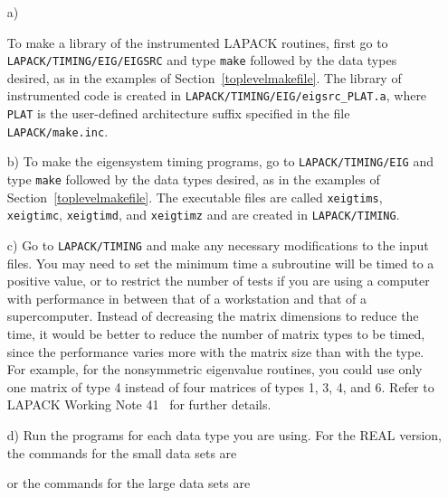 \documentclass[11pt]{report}
\begin{document}
\begin{itemize}
\item[a)]
\begin{sloppypar}
To make a library of the instrumented LAPACK routines, first
go to \texttt{LAPACK/TIMING/EIG/EIGSRC} and type \texttt{make} followed
by the data types desired, as in the examples of Section~\ref{toplevelmakefile}. 
The library of instrumented code is created in
\texttt{LAPACK/TIMING/EIG/eigsrc\_PLAT.a},
where \texttt{PLAT} is the user-defined architecture suffix specified in the
file \texttt{LAPACK/make.inc}.
\end{sloppypar}

\item[b)]
To make the eigensystem timing programs, 
go to \texttt{LAPACK/TIMING/EIG} and
type \texttt{make} followed by the data types desired, as in the examples
of Section~\ref{toplevelmakefile}.  The executable files are called
\texttt{xeigtims}, \texttt{xeigtimc}, \texttt{xeigtimd}, and \texttt{xeigtimz}
and are created in \texttt{LAPACK/TIMING}.

\item[c)]
Go to \texttt{LAPACK/TIMING} and
make any necessary modifications to the input files.
You may need to set the minimum time a subroutine will
be timed to a positive value, or to restrict the number of tests
if you are using a computer with performance in between that of a
workstation and that of a supercomputer.
Instead of decreasing the matrix dimensions to reduce the time,
it would be better to reduce the number of matrix types to be timed,
since the performance varies more with the matrix size than with the
type.  For example, for the nonsymmetric eigenvalue routines,
you could use only one matrix of type 4 instead of four matrices of
types 1, 3, 4, and 6.
Refer to LAPACK Working Note 41~\cite{WN41} for further details.

\item[d)]
Run the programs for each data type you are using. 
For the REAL version, the commands for the small data sets are

or the commands for the large data sets are


\end{itemize}
\end{document}
